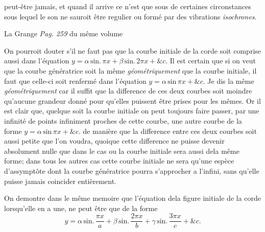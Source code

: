 \documentclass[11pt,a4paper]{article}
\begin{document}


peut-être jamais, et quand il arrive ce n'est que sous de certaines
circonstances sous lequel le son ne sauroit être regulier ou formé
par des  vibrations \emph{isochrones}.

La Grange \emph{Pag. 259} du même volume

On pourroit douter s'il ne faut pas que la courbe initiale de la corde
soit comprise aussi dans l'équation $y = \alpha\,\text{sin.}\,\pi x + \beta\,\text{sin.}\,2\pi x + \&c.$
Il est certain que si on veut que la courbe génératrice soit la même
\emph{géométriquement} que la courbe initiale, il faut que celle-ci soit
renfermé dans l'équation $y = \alpha\,\text{sin}\,\pi x + \&c.$ Je dis la même \emph{géométriquement}
car il suffit que la difference de ces deux courbes soit moindre
qu'aucune grandeur donné pour qu'elles puissent être prises pour
les mêmes. Or il est clair que, quelque soit la courbe initiale
on peut toujours faire passer, par une infinité de points infiniment
proches de cette courbe, une autre courbe de la forme
$y = \alpha\,\text{sin}\,\pi x + \&c.$ de manière que la difference entre ces deux
courbes soit aussi petite que l'on voudra, quoique cette difference
ne puisse devenir absolument nulle que dans le cas ou la courbe
initiale sera aussi dela même forme; dans tous les autres cas cette
courbe initiale ne sera qu'une espèce d'assymptôte dont la courbe
génératrice pourra s'approcher a l'infini, sans qu'elle puisse jamais
coincider entièrement.

On demontre dans le même memoire que l'équation dela
figure initiale de la corde lorsqu'elle en a une, ne peut être
que de la forme
\[ y = \alpha\,\text{sin.}\,\frac{\pi x}{a} + \beta\,\text{sin.}\,\frac{2\pi x}{b} + \gamma\,\text{sin.}\,\frac{3\pi x}{c} + \&c. \]
\end{document}
